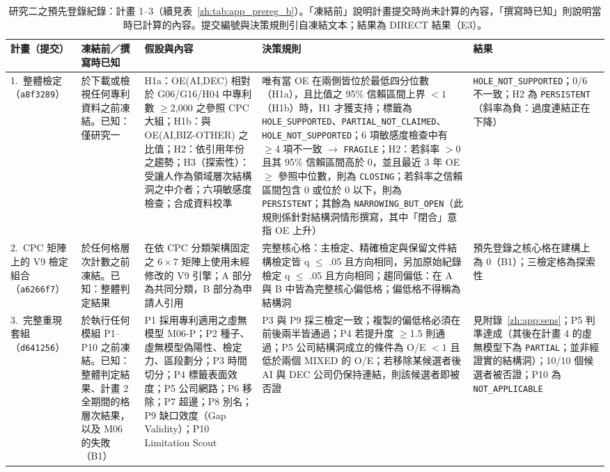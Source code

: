 \begin{table}[tbp]
\centering
\caption{研究二之預先登錄紀錄：計畫 1--3（續見表~\ref{zh:tab:app_prereg_b}）。「凍結前」說明計畫提交時尚未計算的內容，「撰寫時已知」則說明當時已計算的內容。提交編號與決策規則引自凍結文本；結果為 DIRECT 結果（E3）。}
\label{zh:tab:app_prereg}
\footnotesize
\setlength{\tabcolsep}{4pt}
\begin{tabular}{p{2.0cm}p{2.5cm}p{3.7cm}p{4.3cm}p{2.3cm}}
\toprule
計畫（提交） & 凍結前／撰寫時已知 & 假設與內容 & 決策規則 & 結果 \tabularnewline
\midrule
\raggedright 1.~整體檢定（\texttt{a8f3289}） &
\raggedright 於下載或檢視任何專利資料之前凍結。已知：僅研究一 &
\raggedright H1a：OE(AI,DEC) 相對於 G06/G16/H04 中專利數 $\geq$2,000 之參照 CPC 大組；H1b：與 OE(AI,BIZ-OTHER) 之比值；H2：依引用年份之趨勢；H3（探索性）：受讓人作為領域層次結構洞之中介者；六項敏感度檢查；合成資料校準 &
\raggedright 唯有當 OE 在兩側皆位於最低四分位數（H1a），且比值之 95\% 信賴區間上界 $<1$（H1b）時，H1 才獲支持；標籤為 \texttt{HOLE\_\allowbreak SUPPORTED}、\texttt{PARTIAL\_\allowbreak NOT\_\allowbreak CLAIMED}、\texttt{HOLE\_\allowbreak NOT\_\allowbreak SUPPORTED}；6 項敏感度檢查中有 $\geq$4 項不一致 $\rightarrow$ \texttt{FRAGILE}；H2：若斜率 $>0$ 且其 95\% 信賴區間高於 0，並且最近 3 年 OE $\geq$ 參照中位數，則為 \texttt{CLOSING}；若斜率之信賴區間包含 0 或位於 0 以下，則為 \texttt{PERSISTENT}；其餘為 \texttt{NARROWING\_\allowbreak BUT\_\allowbreak OPEN}（此規則係針對結構洞情形撰寫，其中「閉合」意指 OE 上升） &
\raggedright \texttt{HOLE\_\allowbreak NOT\_\allowbreak SUPPORTED}；0/6 不一致；H2 為 \texttt{PERSISTENT}（斜率為負：過度連結正在下降） \tabularnewline
\addlinespace
\raggedright 2.~CPC 矩陣上的 V9 檢定組合（\texttt{a6266f7}） &
\raggedright 於任何格層次計數之前凍結。已知：整體判定結果 &
\raggedright 在依 CPC 分類架構固定之 $6\times7$ 矩陣上使用未經修改的 V9 引擎；A 部分為共同分類，B 部分為申請人引用 &
\raggedright 完整核心格：主檢定、精確檢定與保留文件結構檢定皆 q $\leq$ .05 且方向相同，另加原始紀錄檢定 q $\leq$ .05 且方向相同；趨同偏低：在 A 與 B 中皆為完整核心偏低格；偏低格不得稱為結構洞 &
\raggedright 預先登錄之核心格在建構上為 0（B1）；三檢定格為探索性 \tabularnewline
\addlinespace
\raggedright 3.~完整重現套組（\texttt{d641256}） &
\raggedright 於執行任何模組 P1--P10 之前凍結。已知：整體判定結果、計畫 2 全期間的格層次結果，以及 M06 的失敗（B1） &
\raggedright P1 採用專利適用之虛無模型 M06-P；P2 種子、虛無模型偽陽性、檢定力、區段劃分；P3 時間切分；P4 標籤表面效度；P5 公司網路；P6 移除；P7 超邊；P8 別名；P9 缺口效度（Gap Validity）；P10 Limitation Scout &
\raggedright P3 與 P9 採三檢定一致；複製的偏低格必須在前後兩半皆通過；P4 若提升度 $\geq$1.5 則通過；P5 公司結構洞成立的條件為 O/E $<1$ 且低於兩個 MIXED 的 O/E；若移除某候選者後 AI 與 DEC 公司仍保持連結，則該候選者即被否證 &
\raggedright 見附錄~\ref{zh:app:sens}；P5 判準達成（其後在計畫 4 的虛無模型下為 \texttt{PARTIAL}；並非經證實的結構洞）；10/10 個候選者被否證；P10 為 \texttt{NOT\_\allowbreak APPLICABLE} \tabularnewline
\bottomrule
\end{tabular}
\end{table}

